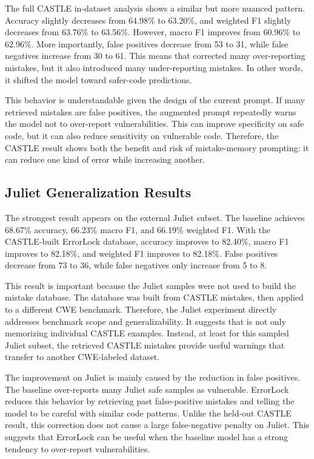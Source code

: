 The full CASTLE in-dataset analysis shows a similar but more nuanced pattern. Accuracy slightly decreases from 64.98\% to 63.20\%, and weighted F1 slightly decreases from 63.76\% to 63.56\%. However, macro F1 improves from 60.96\% to 62.96\%. More importantly, false positives decrease from 53 to 31, while false negatives increase from 30 to 61. This means that \system corrected many over-reporting mistakes, but it also introduced many under-reporting mistakes. In other words, it shifted the model toward safer-code predictions.

This behavior is understandable given the design of the current prompt. If many retrieved mistakes are false positives, the augmented prompt repeatedly warns the model not to over-report vulnerabilities. This can improve specificity on safe code, but it can also reduce sensitivity on vulnerable code. Therefore, the CASTLE result shows both the benefit and risk of mistake-memory prompting: it can reduce one kind of error while increasing another.

\subsection{Juliet Generalization Results}

The strongest result appears on the external Juliet subset. The baseline achieves 68.67\% accuracy, 66.23\% macro F1, and 66.19\% weighted F1. With the CASTLE-built ErrorLock database, accuracy improves to 82.40\%, macro F1 improves to 82.18\%, and weighted F1 improves to 82.18\%. False positives decrease from 73 to 36, while false negatives only increase from 5 to 8.

This result is important because the Juliet samples were not used to build the mistake database. The database was built from CASTLE mistakes, then applied to a different CWE benchmark. Therefore, the Juliet experiment directly addresses benchmark scope and generalizability. It suggests that \system is not only memorizing individual CASTLE examples. Instead, at least for this sampled Juliet subset, the retrieved CASTLE mistakes provide useful warnings that transfer to another CWE-labeled dataset.

The improvement on Juliet is mainly caused by the reduction in false positives. The baseline over-reports many Juliet safe samples as vulnerable. ErrorLock reduces this behavior by retrieving past false-positive mistakes and telling the model to be careful with similar code patterns. Unlike the held-out CASTLE result, this correction does not cause a large false-negative penalty on Juliet. This suggests that ErrorLock can be useful when the baseline model has a strong tendency to over-report vulnerabilities.

